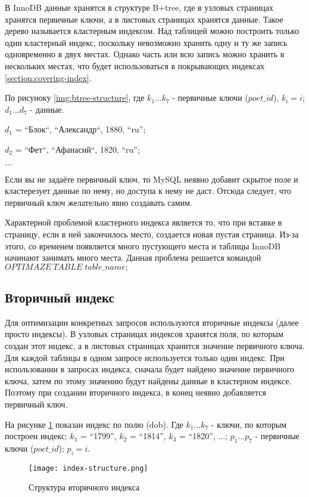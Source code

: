 В InnoDB данные хранятся в структуре B+tree, где в узловых страницах хранятся первичные ключи, а в листовых страницах хранятся данные. Такое дерево называется кластерным индексом. Над таблицей можно построить только один кластерный индекс, поскольку невозможно хранить одну и ту же запись одновременно в двух местах. Однако часть или всю запись можно хранить в нескольких местах, что будет использоваться в покрывающих индексах \ref{section:covering-index}.

По рисуноку \ref{img:btree-structure}, где $k_1 \ldots k_7$ - первичные ключи ($poet\_id$), $k_i = i$; $d_1 \ldots d_7$ - данные.

$d_1$ = “Блок“, “Александр“, 1880, “ru”; 

$d_2$ = “Фет“, “Афанасий“, 1820, “ru”;

$\ldots$

Если вы не задаёте первичный ключ, то MySQL неявно добавит скрытое поле и кластерезует данные по нему, но доступа к нему не даст. Отсюда следует, что первичный ключ желательно явно создавать самим.

Характерной проблемой кластерного индекса является то, что при вставке в страницу, если в ней закончилось место, создается новая пустая страница. Из-за этого, со временем появляется много пустующего места и таблицы InnoDB начинают занимать много места. Данная проблема решается командой $OPTIMAZE\:TABLE\;table\_name;$

\subsection{Вторичный индекс}

Для оптимизации конкретных запросов используются вторичные индексы (далее просто индексы). В узловых страницах индексов хранятся поля, по которым создан этот индекс, а в листовых страницах хранится значение первичного ключа. Для каждой таблицы в одном запросе используется только один индекс. При использовании в запросах индекса, сначала будет найдено значение первичного ключа, затем по этому значению будут найдены данные в кластерном индексе. Поэтому при создании вторичного индекса, в конец неявно добавляется первичный ключ.

На рисунке \ref{img:index-structure} показан индекс по полю (dob). Где $k_1 \ldots k_7$ - ключи, по которым построен индекс; $k_1$ = “1799”, $k_2$ = “1814”, $k_3$ = “1820”, $\ldots$; $p_1 \ldots p_7$ - первичные ключи ($poet\_id$); $p_i = i$.

\begin{figure}[H]
  \centering
  \texttt{[image: index-structure.png]}
  \caption{Структура вторичного индекса}
  \label{img:index-structure}
\end{figure}

